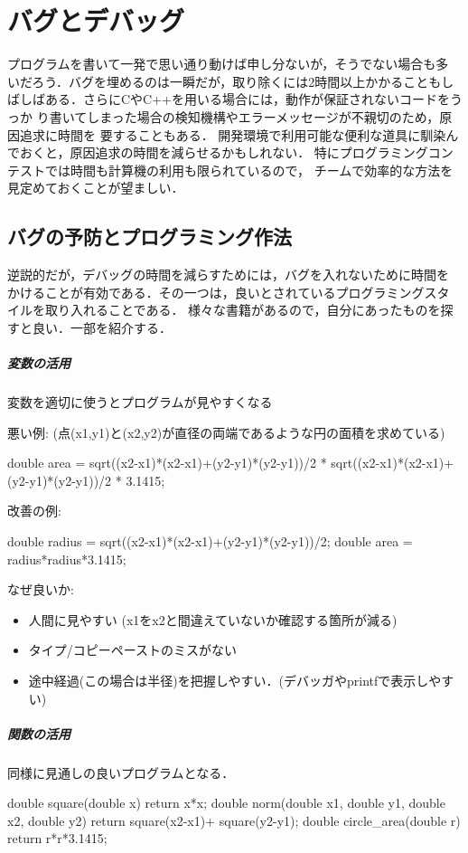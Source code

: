 \chapter{バグとデバッグ}\label{chapter:debug}

プログラムを書いて一発で思い通り動けば申し分ないが，そうでない場合も多
いだろう．バグを埋めるのは一瞬だが，取り除くには2時間以上かかることもしばしばある．さらにCやC++を用いる場合には，動作が保証されないコードをうっか
り書いてしまった場合の検知機構やエラーメッセージが不親切のため，原因追求に時間を
要することもある．
開発環境で利用可能な便利な道具に馴染んでおくと，原因追求の時間を減らせるかもしれない．
特にプログラミングコンテストでは時間も計算機の利用も限られているので，
チームで効率的な方法を見定めておくことが望ましい．

\section{バグの予防とプログラミング作法}
逆説的だが，デバッグの時間を減らすためには，バグを入れないために時間を
かけることが有効である．その一つは，良いとされているプログラミングスタ
イルを取り入れることである．
様々な書籍があるので，自分にあったものを探すと良い．一部を紹介する．

\paragraph{変数の活用} 変数を適切に使うとプログラムが見やすくなる

悪い例: (点(x1,y1)と(x2,y2)が直径の両端であるような円の面積を求めている)
\begin{cbox}
double area = sqrt((x2-x1)*(x2-x1)+(y2-y1)*(y2-y1))/2
 * sqrt((x2-x1)*(x2-x1)+(y2-y1)*(y2-y1))/2 * 3.1415;\end{cbox}
改善の例:
\begin{cbox}
double radius = sqrt((x2-x1)*(x2-x1)+(y2-y1)*(y2-y1))/2;
double area = radius*radius*3.1415;\end{cbox}
なぜ良いか:
\begin{itemize}
\setlength{\itemsep}{0pt}
\item 人間に見やすい (x1をx2と間違えていないか確認する箇所が減る)
\item タイプ/コピーペーストのミスがない
\item 途中経過(この場合は半径)を把握しやすい．(デバッガやprintfで表示しやすい)
\end{itemize}

\paragraph{関数の活用} 同様に見通しの良いプログラムとなる．
  \begin{cbox}
double square(double x) { return x*x; }
double norm(double x1, double y1, double x2, double y2) {
  return square(x2-x1)+ square(y2-y1);
}
double circle_area(double r) { return r*r*3.1415; }\end{cbox}
